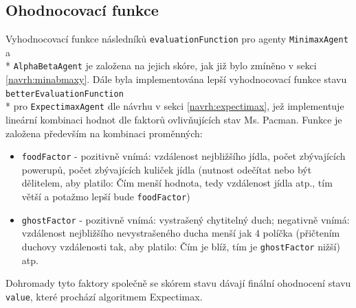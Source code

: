 \subsection{Ohodnocovací funkce}
Vyhodnocovací funkce následníků \texttt{evaluationFunction} pro agenty \texttt{MinimaxAgent} a \\* \texttt{AlphaBetaAgent} je založena na jejich skóre, jak již bylo zmíněno v sekci \ref{navrh:minabmaxy}.
Dále byla implementována lepší vyhodnocovací funkce stavu \texttt{betterEvaluationFunction} \\* pro \texttt{ExpectimaxAgent} dle návrhu v sekci \ref{navrh:expectimax}, jež implementuje lineární kombinaci hodnot dle faktorů ovlivňujících stav Ms. Pacman. Funkce je založena především na kombinaci proměnných:
\begin{itemize}
  \item \texttt{foodFactor} - pozitivně vnímá: vzdálenost nejbližšího jídla, počet zbývajících powerupů, počet zbývajících kuliček jídla (nutnost odečítat nebo být dělitelem, aby platilo: Čím menší hodnota, tedy vzdálenost jídla atp., tím větší a potažmo lepší bude \texttt{foodFactor}) 
  \item \texttt{ghostFactor} - pozitivně vnímá: vystrašený chytitelný duch; negativně vnímá: vzdálenost nejbližšího nevystrašeného ducha menší jak 4 políčka (přičtením duchovy vzdálenosti tak, aby platilo: Čím je blíž, tím je \texttt{ghostFactor} nižší) atp.
\end{itemize}
Dohromady tyto faktory společně se skórem stavu dávají finální ohodnocení stavu \texttt{value}, které prochází algoritmem Expectimax.

